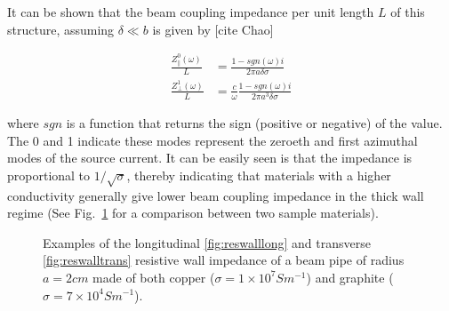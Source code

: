 It can be shown that the beam coupling impedance per unit length $L$ of this structure, assuming $\delta \ll b$ is given by [cite Chao]

\begin{align}
\frac{Z_{\parallel}^{0}  \left( \omega \right)}{L} &= \frac{1 - sgn \left( \omega \right) i }{2 \pi a \delta \sigma} \\
\frac{Z_{\perp}^{1}  \left( \omega \right)}{L} &= \frac{c}{\omega}\frac{1 - sgn \left( \omega \right) i }{2 \pi a^{3} \delta \sigma}
\end{align}

where $sgn$ is a function that returns the sign (positive or negative) of the value. The 0 and 1 indicate these modes represent the zeroeth and first azimuthal modes of the source current. It can be easily seen is that the impedance is proportional to $1/ \sqrt{\sigma}$, thereby indicating that materials with a higher conductivity generally give lower beam coupling impedance in the thick wall regime (See Fig.~\ref{fig:resWallImpComp} for a comparison between two sample materials).

\begin{figure}

\caption{Examples of the longitudinal \ref{fig:reswalllong} and transverse \ref{fig:reswalltrans} resistive wall impedance of a beam pipe of radius $a = 2cm$ made of both copper ($\sigma = 1 \times 10^{7} S m^{-1}$) and graphite ($\sigma = 7 \times 10^{4} S m^{-1}$).}
\label{fig:resWallImpComp}
\end{figure}

